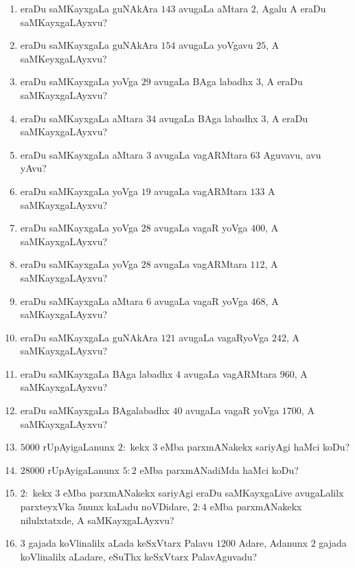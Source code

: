 \begin{enumerate}
\item eraDu saMKayxgaLa guNAkAra $143$ avugaLa aMtara $2$, Agalu A
eraDu saMKayxgaLAyxvu?

\item eraDu saMKayxgaLa guNAkAra $154$ avugaLa yoVgavu $25$, A
saMKeyxgaLAyxvu? 

\item eraDu saMKayxgaLa yoVga $29$ avugaLa BAga labadhx $3$, A eraDu
saMKayxgaLAyxvu? 

\item eraDu saMKayxgaLa aMtara $34$ avugaLa BAga labadhx $3$, A eraDu
saMKayxgaLAyxvu? 

\item eraDu saMKayxgaLa aMtara $3$ avugaLa vagARMtara $63$ Aguvavu,
avu yAvu?

\item eraDu saMKayxgaLa yoVga $19$ avugaLa vagARMtara $133$ A
saMKayxgaLAyxvu? 

\item eraDu saMKayxgaLa yoVga $28$ avugaLa vagaR yoVga $400$, A
saMKayxgaLAyxvu? 

\item eraDu saMKayxgaLa yoVga $28$ avugaLa vagARMtara $112$, A
saMKayxgaLAyxvu?

\item eraDu saMKayxgaLa aMtara $6$ avugaLa vagaR yoVga $468$, A
saMKayxgaLAyxvu?

\item eraDu saMKayxgaLa guNAkAra $121$ avugaLa vagaRyoVga $242$, A
saMKayxgaLAyxvu? 

\item eraDu saMKayxgaLa BAga labadhx $4$ avugaLa vagARMtara $960$, A
saMKayxgaLAyxvu? 

\item eraDu saMKayxgaLa BAgalabadhx $40$ avugaLa vagaR yoVga $1700$, A
saMKayxgaLAyxvu?

\item $5000$ rUpAyigaLanunx $2:$ kekx $3$ eMba parxmANakekx sariyAgi
haMci koDu?

\item $28000$ rUpAyigaLanunx $5:2$ eMba parxmANadiMda haMci koDu?

\item $2:$ kekx $3$ eMba parxmANakekx sariyAgi eraDu saMKayxgaLive
avugaLalilx parxteyxVka $5$nunx kaLadu noVDidare, $2:4$ eMba
parxmANakekx nilulxtatxde, A saMKayxgaLAyxvu?

\item $3$ gajada koVlinalilx aLada keSxVtarx Palavu $1200$ Adare,
Adanunx $2$ gajada koVlinalilx aLadare, eSuThx keSxVtarx PalavAguvadu?


\end{enumerate}
